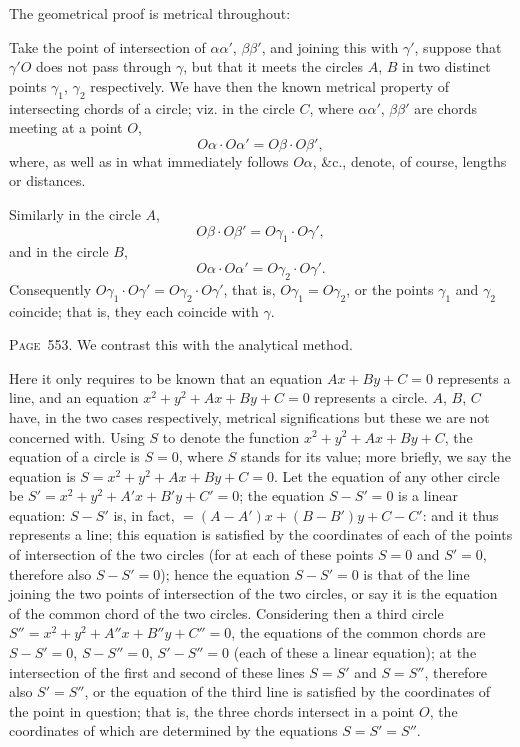 \documentclass[11pt,a4paper]{article}
\theoremstyle{definition}
\begin{document}
The geometrical proof is metrical throughout:

Take the point of intersection of $\alpha\alpha'$, $\beta\beta'$, and joining this with $\gamma'$, suppose that $\gamma'O$ does not pass through $\gamma$, but that it meets the circles $A$, $B$ in two distinct points $\gamma_1$, $\gamma_2$ respectively. We have then the known metrical property of intersecting chords of a circle; viz. in the circle $C$, where $\alpha\alpha'$, $\beta\beta'$ are chords meeting at a point $O$,
\[
O\alpha \cdot O\alpha' = O\beta \cdot O\beta',
\]
where, as well as in what immediately follows $O\alpha$, \&c., denote, of course, lengths or distances.

Similarly in the circle $A$,
\[
O\beta \cdot O\beta' = O\gamma_1 \cdot O\gamma',
\]
and in the circle $B$,
\[
O\alpha \cdot O\alpha' = O\gamma_2 \cdot O\gamma'.
\]
Consequently $O\gamma_1 \cdot O\gamma' = O\gamma_2 \cdot O\gamma'$, that is, $O\gamma_1 = O\gamma_2$, or the points $\gamma_1$ and $\gamma_2$ coincide; that is, they each coincide with $\gamma$.

\newpage
\noindent\textsc{Page~553.} We contrast this with the analytical method.

Here it only requires to be known that an equation $Ax+By+C=0$ represents a line, and an equation $x^2+y^2+Ax+By+C=0$ represents a circle. $A$, $B$, $C$ have, in the two cases respectively, metrical significations but these we are not concerned with. Using $S$ to denote the function $x^2+y^2+Ax+By+C$, the equation of a circle is $S=0$, where $S$ stands for its value; more briefly, we say the equation is $S=x^2+y^2+Ax+By+C=0$. Let the equation of any other circle be $S'=x^2+y^2+A'x+B'y+C'=0$; the equation $S-S'=0$ is a linear equation: $S-S'$ is, in fact, $=(A-A')x+(B-B')y+C-C'$: and it thus represents a line; this equation is satisfied by the coordinates of each of the points of intersection of the two circles (for at each of these points $S=0$ and $S'=0$, therefore also $S-S'=0$); hence the equation $S-S'=0$ is that of the line joining the two points of intersection of the two circles, or say it is the equation of the common chord of the two circles. Considering then a third circle $S''=x^2+y^2+A''x+B''y+C''=0$, the equations of the common chords are $S-S'=0$, $S-S''=0$, $S'-S''=0$ (each of these a linear equation); at the intersection of the first and second of these lines $S=S'$ and $S=S''$, therefore also $S'=S''$, or the equation of the third line is satisfied by the coordinates of the point in question; that is, the three chords intersect in a point $O$, the coordinates of which are determined by the equations $S=S'=S''$.
\end{document}
